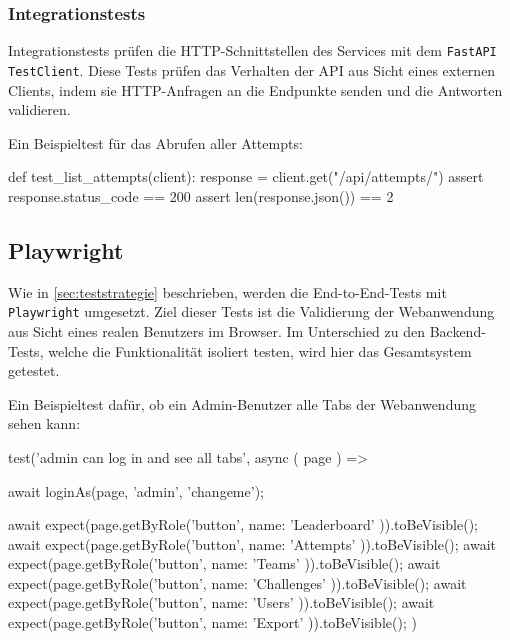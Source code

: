 \newpage

\subsubsection{Integrationstests}
Integrationstests prüfen die HTTP-Schnittstellen des Services mit dem \texttt{FastAPI TestClient}\cite{fastapi_testclient}.
Diese Tests prüfen das Verhalten der \gls{API} aus Sicht eines externen Clients, indem sie HTTP-Anfragen an die Endpunkte senden und die Antworten validieren.

Ein Beispieltest für das Abrufen aller Attempts:
\begin{CodeBox}[language=Python]
def test_list_attempts(client):
    response = client.get("/api/attempts/")
    assert response.status_code == 200
    assert len(response.json()) == 2
\end{CodeBox}



\subsection{Playwright}
Wie in \ref{sec:teststrategie} beschrieben, werden die End-to-End-Tests mit \texttt{Playwright}\cite{playwright} umgesetzt.
Ziel dieser Tests ist die Validierung der Webanwendung aus Sicht eines realen Benutzers im Browser.
Im Unterschied zu den Backend-Tests, welche die Funktionalität isoliert testen, wird hier das Gesamtsystem getestet.

Ein Beispieltest dafür, ob ein Admin-Benutzer alle Tabs der Webanwendung sehen kann:
\begin{CodeBox}
test('admin can log in and see all tabs', async ({ page }) => {
  await loginAs(page, 'admin', 'changeme');

  await expect(page.getByRole('button', { name: 'Leaderboard' })).toBeVisible();
  await expect(page.getByRole('button', { name: 'Attempts' })).toBeVisible();
  await expect(page.getByRole('button', { name: 'Teams' })).toBeVisible();
  await expect(page.getByRole('button', { name: 'Challenges' })).toBeVisible();
  await expect(page.getByRole('button', { name: 'Users' })).toBeVisible();
  await expect(page.getByRole('button', { name: 'Export' })).toBeVisible();
)}
\end{CodeBox}
